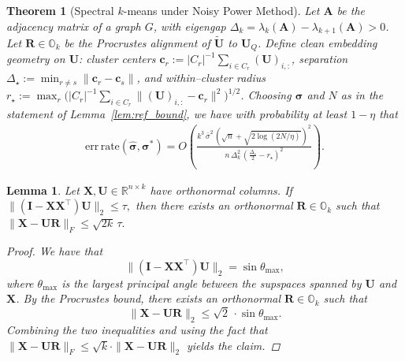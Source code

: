 \documentclass[10pt,a4paper]{amsart}
\newtheorem{lemma}{Lemma}
\newtheorem{theorem}{Theorem}
\begin{document}
\begin{theorem}[Spectral $k$-means under Noisy Power Method]
\label{thm:main_explicit_power_method}
Let $\mathbf{A}$ be the adjacency matrix of a graph $G$, with eigengap $\Delta_k=\lambda_{k}(\mathbf{A})-\lambda_{k+1}(\mathbf{A})>0$. 
Let $\mathbf{R}\in\mathbb{O}_k$ be the Procrustes alignment of $\widetilde{\mathbf{U}}$ to $\mathbf{U}_Q$.
Define clean embedding geometry on $\mathbf{U}$: cluster centers
$\mathbf{c}_r:=|C_r|^{-1}\sum_{i\in C_r}(\mathbf{U})_{i,:}$, separation
$\Delta_\star:=\min_{r\ne s}\|\mathbf{c}_r-\mathbf{c}_s\|$, and within–cluster radius
$r_\star:=\max_r\big(|C_r|^{-1}\sum_{i\in C_r}\|(\mathbf{U})_{i,:}-\mathbf{c}_r\|^2\big)^{1/2}$.
Choosing $\bm{\sigma}$ and $N$ as in the statement of Lemma~\ref{lem:ref_bound}, we have with probability at least $1-\eta$ that
\begin{equation*}
    \begin{aligned}
\mathrm{err\,rate}(\hat{\bm{\sigma}},\bm{\sigma}^\ast)
=
 O\!\left( \frac{ k^3 \, \bar{\sigma}^2 \, \left( \sqrt{n} + \sqrt{2 \log\left( {2N}/{\eta} \right)} \right)^2}{n \, \Delta_k^2\,(\tfrac{\Delta_\star}{2}-r_\star)^2}
\right).        
    \end{aligned}
\end{equation*}
\end{theorem}

\begin{lemma} \label{lem:projection_to_U}
Let $\mathbf{X},\mathbf{U}\in\mathbb{R}^{n\times k}$ have orthonormal columns.  
If
$
\|(\mathbf{I}-\mathbf{X}\mathbf{X}^\top)\mathbf{U}\|_2 \le \tau,
$
then there exists an orthonormal $\mathbf{R}\in \mathds{O}_{k}$ such that
$
\|\mathbf{X}-\mathbf{U}\mathbf{R}\|_F \le \sqrt{2k}\,\tau.
$
\begin{proof}
We have that 
$$
\|(\mathbf{I}-\mathbf{X}\mathbf{X}^\top)\mathbf{U}\|_2 = \sin\theta_{\max},
$$
where $\theta_{\max}$ is the largest principal angle between the supspaces spanned by $\mathbf{U}$ and $\mathbf{X}$.
By the Procrustes bound, there exists an orthonormal $\mathbf{R} \in \mathbb{O}_{k}$ such that
$$
 \|\mathbf{X}-\mathbf{U}\mathbf{R}\|_2 \le \sqrt{2}\, \cdot \sin\theta_{\max}.
$$
Combining the two inequalities and using the fact that $\|\mathbf{X}-\mathbf{U}\mathbf{R}\|_F \leq \sqrt{k} \cdot \|\mathbf{X}-\mathbf{U}\mathbf{R}\|_2 $ yields the claim.    
\end{proof}
\end{lemma}
\end{document}
